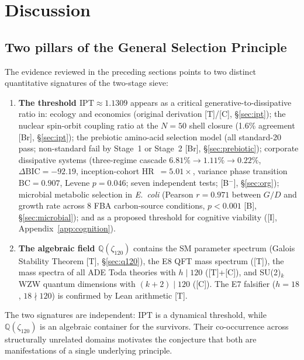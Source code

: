 \documentclass[11pt]{article}
\theoremstyle{remark}
\newcommand{\IPT}{\mathrm{IPT}}
\newcommand{\zetaN}[1]{\zeta_{#1}}
\begin{document}
\section{Discussion}

\subsection{Two pillars of the General Selection Principle}

The evidence reviewed in the preceding sections points to two distinct quantitative
signatures of the two-stage sieve:

\begin{enumerate}
  \item \textbf{The threshold $\IPT \approx 1.1309$} appears as a critical
        generative-to-dissipative ratio in:
        ecology and economics (original derivation [T]/[C], §\ref{sec:ipt});
        the nuclear spin-orbit coupling ratio at the $N=50$ shell closure
        (1.6\% agreement [Br], §\ref{sec:ipt});
        the prebiotic amino-acid selection model (all standard-20 pass;
        non-standard fail by Stage~1 or Stage~2 [Br], §\ref{sec:prebiotic});
        corporate dissipative systems (three-regime cascade $6.81\%\to 1.11\%\to 0.22\%$,
        $\Delta\mathrm{BIC}=-92.19$, inception-cohort HR~$=5.01\times$,
        variance phase transition $\mathrm{BC}=0.907$, Levene $p=0.046$;
        seven independent tests; [B$^-$], §\ref{sec:org});
        microbial metabolic selection in \emph{E.~coli} (Pearson $r = 0.971$ between
        $G/D$ and growth rate across 8 FBA carbon-source conditions, $p < 0.001$
        [B], §\ref{sec:microbial});
        and as a proposed threshold for cognitive viability
        ([I], Appendix~\ref{app:cognition}).
  \item \textbf{The algebraic field $\mathbb{Q}(\zetaN{120})$} contains the SM
        parameter spectrum (Galois Stability Theorem [T], §\ref{sec:q120}),
        the E8 QFT mass spectrum ([T]), the mass spectra of all ADE Toda theories
        with $h\mid 120$ ([T]+[C]), and SU(2)$_k$ WZW quantum dimensions
        with $(k+2)\mid 120$ ([C]).
        The E7 falsifier ($h=18$, $18\nmid 120$) is confirmed by Lean arithmetic [T].
\end{enumerate}

The two signatures are independent: $\IPT$ is a dynamical threshold, while
$\mathbb{Q}(\zetaN{120})$ is an algebraic container for the survivors.
Their co-occurrence across structurally unrelated domains motivates the conjecture
that both are manifestations of a single underlying principle.
\end{document}
